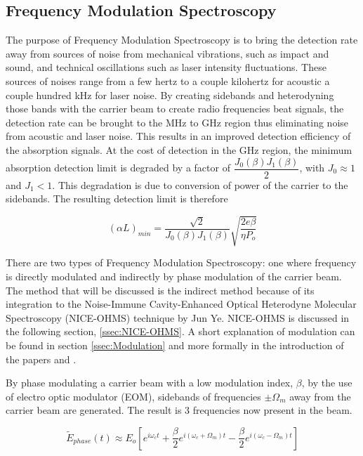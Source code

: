 \documentclass[a4paper]{book}
\begin{document}
\subsection{Frequency Modulation Spectroscopy}
\label{ssec:FMspec}
The purpose of Frequency Modulation Spectroscopy is to bring the detection rate away from sources of noise from mechanical vibrations, such as impact and sound, and technical oscillations such as laser intensity fluctuations. These sources of noises range from a few hertz to a couple kilohertz for acoustic a couple hundred kHz for laser noise.  By creating sidebands and heterodyning those bands with the carrier beam to create radio frequencies beat signals, the detection rate can be brought to the MHz to GHz region thus eliminating noise from acoustic and laser noise. This results in an improved detection efficiency of the absorption signals. At the cost of detection in the GHz region, the minimum absorption detection limit is degraded by a factor of $\dfrac{J_0(\beta)J_1(\beta)}{2}$, with $J_0 \approx 1$ and $J_1 < 1 $. This degradation is due to conversion of power of the carrier to the sidebands. The resulting detection limit is therefore

\begin{equation}
\label{eq:FMSlimit}
(\alpha L)_{min}=\dfrac{\sqrt{2}}{J_0(\beta)J_1(\beta)}\sqrt{\dfrac{2e\beta}{\eta P_o}}
\end{equation}

There are two types of Frequency Modulation Spectroscopy: one where frequency is directly modulated and indirectly by phase modulation of the carrier beam. The method that will be discussed is the indirect method because of its integration to the Noise-Immune Cavity-Enhanced Optical Heterodyne Molecular Spectroscopy (NICE-OHMS) technique by Jun Ye. NICE-OHMS is discussed in the following section, \ref{ssec:NICE-OHMS}.  A short explanation of modulation can be found in section \ref{ssec:Modulation} and more formally in the introduction of the papers \cite{PDH Intro} and \cite{FMspec}.

By phase modulating a carrier beam with a low modulation index, $\beta$, by the use of electro optic modulator (EOM), sidebands of frequencies $\pm \Omega_m $ away from the carrier beam are generated. The result is 3 frequencies now present in the beam.

\begin{equation}
\label{eq:sidebands}
\tilde{E}_{phase}(t)\approx E_o [e^{i\omega_c t}   +   \dfrac{\beta}{2} e^{i(\omega_c +\Omega_m)t}  -  \dfrac{\beta}{2} e^{i(\omega_c -\Omega_m)t}]
\end{equation}	
\end{document}
